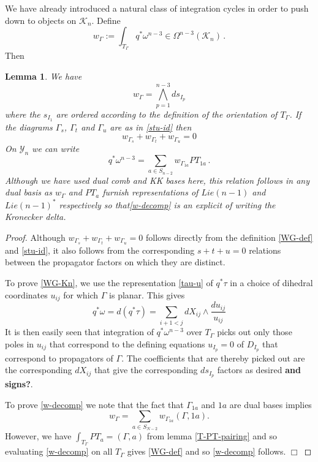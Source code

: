 \documentclass[11pt]{article}
\newcommand{\cK}{\mathcal{K}}
\newcommand{\cY}{\mathcal{Y}}
\newcommand{\1}{{\rm 1\hskip-0.25em I}}
\newtheorem{lemma}{Lemma}[section]
\begin{document}
We have already introduced a natural class of integration cycles in order to push down to objects on $\cK_n$.  
Define
\begin{equation}  
w_\Gamma:=\int_{T_\Gamma} q^* \omega^{n-3} \in \Omega^{n-3}(\cK_n)\, .\label{WG-def}
\end{equation}
Then
\begin{lemma}  We have
\begin{equation}
w_\Gamma=\bigwedge_{p=1}^{n-3} ds_{I_p} \label{WG-Kn}
\end{equation}
where the $s_{I_1}$ are ordered according to the definition of the orientation of $T_\Gamma$.  If the diagrams $\Gamma_s$, $\Gamma_t$ and $\Gamma_u$ are as in \eqref{stu-id} then \begin{equation}
 w_{\Gamma_s}+w_{\Gamma_t}+w_{\Gamma_u}=0 \label{WG-stu}
\end{equation}
On $\cY_n$ we can write
\begin{equation}
q^*\omega^{n-3}=\sum_{a\in S_{n-2}} w_{\Gamma_{1a}}  PT_{1a}\, .
\label{w-decomp}
\end{equation}
Although we have used dual comb and KK bases here, this relation follows in any dual basis as $w_\Gamma$ and $PT_a$ furnish representations of $Lie(n-1)$ and $Lie(n-1)^*$ respectively so that\eqref{w-decomp} is an explicit of writing the Kronecker delta.
\end{lemma}

\begin{proof}
Although $w_{\Gamma_s}+w_{\Gamma_t}+w_{\Gamma_u}=0$ follows directly from the  definition \eqref{WG-def} and \eqref{stu-id}, it also follows from the corresponding $s+t+u=0$ relations between the propagator factors on which they are distinct.  

To prove \eqref{WG-Kn}, we use the representation \eqref{tau-u} of $q^*\tau$ in a choice of dihedral coordinates $u_{ij}$ for which $\Gamma$ is planar. This gives
\begin{equation}
q^*\omega=d(q^*\tau)=\sum_{i+1<j} d X_{ij}\wedge\frac{du_{ij}}{u_{ij}}
\end{equation}
 It is then easily seen that integration of $q^*\omega^{n-3}$  over $T_\Gamma$ picks out only those poles in $u_{ij}$ that correspond to the defining equations  $u_{I_p}=0$ of $D_{I_p}$  that correspond to propagators of $\Gamma$.  The coefficients that are thereby picked out are the corresponding $dX_{ij}$ that give the corresponding $ds_{I_p}$ factors as desired {\bf and signs?}.

To prove \eqref{w-decomp} we note that the fact that $\Gamma_{1a}$ and $1a$ are dual bases implies 
\begin{equation}
w_\Gamma=\sum_{a\in S_{N-2}} w_{\Gamma_{1a}} (\Gamma,1a).  
\end{equation}
However, we have $\int_{T_\Gamma} PT_a=(\Gamma,a)$ from lemma \ref{T-PT-pairing} and so evaluating \eqref{w-decomp} on all $T_\Gamma$ gives \eqref{WG-def} and so \eqref{w-decomp} follows. $\Box$
\end{proof}
\end{document}
